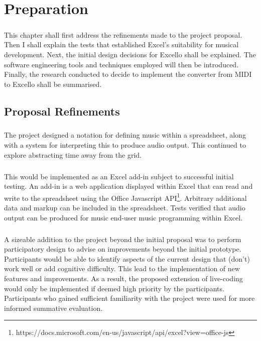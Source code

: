 
\chapter{Preparation}

\paragraph{} This chapter shall first address the refinements made to the project proposal. Then I shall explain the tests that established Excel's suitability for musical development. Next, the initial design decisions for Excello shall be explained. The software engineering tools and techniques employed will then be introduced. Finally, the research conducted to decide to implement the converter from MIDI to Excello shall be summarised.

\section{Proposal Refinements}

\paragraph{} The project designed a notation for defining music within a spreadsheet, along with a system for interpreting this to produce audio output. This continued to explore abstracting time away from the grid.

\paragraph{} This would be implemented as an Excel add-in subject to successful initial testing. An add-in is a web application displayed within Excel that can read and write to the spreadsheet using the Office Javascript API\footnote{https://docs.microsoft.com/en-us/javascript/api/excel?view=office-js}. Arbitrary additional data and markup can be included in the spreadsheet. Tests verified that audio output can be produced for music end-user music programming within Excel.

\paragraph{} A sizeable addition to the project beyond the initial proposal was to perform participatory design \cite{muller:pd} to advise on improvements beyond the initial prototype. Participants would be able to identify aspects of the current design that (don't) work well or add cognitive difficulty. This lead to the implementation of new features and improvements. As a result, the proposed extension of live-coding would only be implemented if deemed high priority by the participants. Participants who gained sufficient familiarity with the project were used for more informed summative evaluation.

